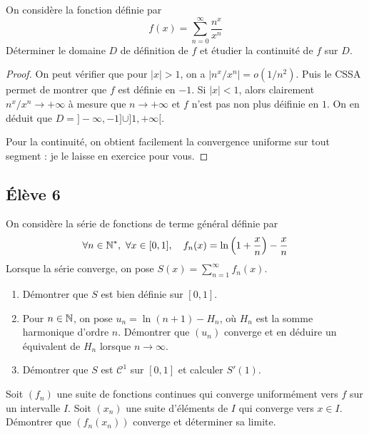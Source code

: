 \documentclass[10pt]{scrartcl}
\begin{document}
    \begin{exo}
        On considère la fonction définie par 
        \[
            f(x) = \sum_{n=0}^\infty\frac{n^x}{x^n}
        \]
        Déterminer le domaine $D$ de définition de $f$ et étudier la continuité de $f$ sur $D$.
    \end{exo}

    \begin{proof}
        On peut vérifier que pour $|x|>1$, on a $|n^x/x^n|=o(1/n^2)$. 
        Puis le CSSA permet de montrer que $f$ est définie en $-1$.
        Si $|x|<1$, alors clairement $n^x/x^n\to+\infty$ à mesure que $n\to+\infty$ et $f$ n'est pas non plus déifinie en $1$.
        On en déduit que $D=]-\infty,-1]\cup]1,+\infty[$.

        Pour la continuité, on obtient facilement la convergence uniforme sur tout segment : je le laisse en exercice pour vous.
    \end{proof}

    \subsection*{Élève 6}
    \begin{ccp}
        On considère la série de fonctions de terme général définie par 
        \[
            \forall n\in\operatorname{\mathbb N}^*,\ \forall x\in[0,1],\quad f_n(x)=\ln\left(1+\frac xn\right)-\frac xn
        \]
        Lorsque la série converge, on pose $S(x)=\sum_{n=1}^\infty f_n(x)$.
        \begin{enumerate}
            \item Démontrer que $S$ est bien définie sur $[0,1]$.
            \item Pour $n\in\operatorname{\mathbb N}$, on pose $u_n=\ln(n+1)-H_n$, où $H_n$ est la somme harmonique d'ordre $n$.
            Démontrer que $(u_n)$ converge et en déduire un équivalent de $H_n$ lorsque $n\to\infty$.
            \item Démontrer que $S$ est $\mathcal C^1$ sur $[0,1]$ et calculer $S'(1)$.
        \end{enumerate}
    \end{ccp}

    \begin{exo}
        Soit $(f_n)$ une suite de fonctions continues qui converge uniformément vers $f$ sur un intervalle $I$.
        Soit $(x_n)$ une suite d'éléments de $I$ qui converge vers $x\in I$. 
        Démontrer que $(f_n(x_n))$ converge et déterminer sa limite.
    \end{exo}
\end{document}
